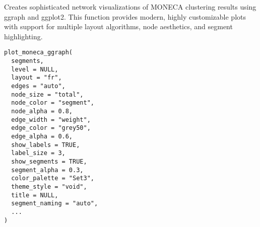 \documentclass[a4paper]{book}
\begin{document}
%
\begin{Description}
Creates sophisticated network visualizations of MONECA clustering results using
ggraph and ggplot2. This function provides modern, highly customizable plots
with support for multiple layout algorithms, node aesthetics, and segment highlighting.
\end{Description}
%
\begin{Usage}
\begin{verbatim}
plot_moneca_ggraph(
  segments,
  level = NULL,
  layout = "fr",
  edges = "auto",
  node_size = "total",
  node_color = "segment",
  node_alpha = 0.8,
  edge_width = "weight",
  edge_color = "grey50",
  edge_alpha = 0.6,
  show_labels = TRUE,
  label_size = 3,
  show_segments = TRUE,
  segment_alpha = 0.3,
  color_palette = "Set3",
  theme_style = "void",
  title = NULL,
  segment_naming = "auto",
  ...
)
\end{verbatim}
\end{Usage}
%
\end{document}
